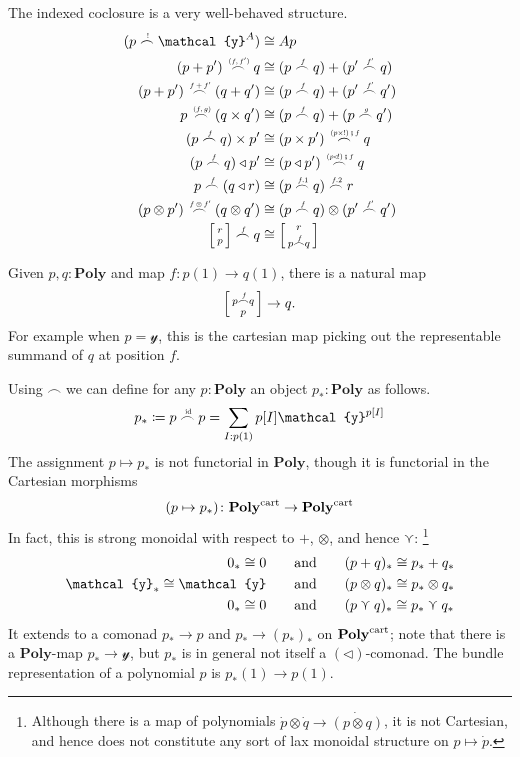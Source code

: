\documentclass[11pt, one side, article]{memoir}
\makeatletter
\theoremstyle{definition}
\theoremstyle{plain}
\newcommand{\Cat}[1]{\mathbf{#1}}%
\newcommand{\id}{\mathrm{id}}
\newcommand{\then}{\mathbin{\fatsemi}}
\newcommand{\tn}[1]{\textnormal{#1}}
\newcommand{\yon}{{\mathcal{y}}}
\newcommand{\poly}{\Cat{Poly}}
\newcommand{\polycart}{\poly^{\tn{cart}}}
\newcommand{\0}{\textsf{0}}
\newcommand{\1}{\tn{\textsf{1}}}
\newcommand{\tri}{\mathbin{\triangleleft}}
\newcommand{\biglens}[2]{
     \begin{bmatrix}{\vphantom{f_f^f}#2} \\ {\vphantom{f_f^f}#1} \end{bmatrix}
}
\newcommand{\littlelens}[2]{
     \begin{bsmallmatrix}{\vphantom{f}#2} \\ {\vphantom{f}#1} \end{bsmallmatrix}
}
\newcommand{\lens}[2]{
  \relax\if@display
     \biglens{#1}{#2}
  \else
     \littlelens{#1}{#2}
  \fi
}
\newcommand{\indexcoclscale}[1]{\scalebox{.7}{#1}}
\newcommand{\cocl}[1]{
	\scriptsize\overset{\,\indexcoclscale{$#1$}}{\frown}\normalsize
}
\newcommand{\hh}[2][]{#1 \tn{#2} #1}
\newcommand{\qqand}{\hh[\qquad]{and}}
\makeatother
\begin{document}
The indexed coclosure is a very well-behaved structure.
\begin{align}
	(p\cocl{!}\yon^A)&\cong Ap\\
	(p+p')\cocl{(f,f')}q&\cong(p\cocl{f}q)+(p'\cocl{f'}q)\\
	(p+p')\cocl{f+f'}(q+q')&\cong(p\cocl{f}q)+(p'\cocl{f'}q')\\
	p\cocl{(f,g)}(q\times q')&\cong(p\cocl{f}q)+(p\cocl{g}q')\\
	(p\cocl{f}q)\times p'&\cong(p\times p')\cocl{(p\times!)\then f}q\\
	(p\cocl{f}q)\tri p'&\cong(p\tri p')\cocl{(p\tri!)\then f}q\\
	p\cocl{f}(q\tri r)&\cong(p\cocl{f.1}q)\cocl{f.2}r\\
	(p\otimes p')\cocl{f\otimes f'}(q\otimes q')&\cong(p\cocl{f}q)\otimes(p'\cocl{f'}q')\\
	\lens{p}{r}\cocl{f}q&\cong\lens{p\cocl{f}q}{r}
\end{align}

Given $p,q:\poly$ and map $f\colon p(1)\to q(1)$, there is a natural map
\begin{equation}
	\lens{p}{p\cocl{f}q}\to q.
\end{equation}
For example when $p=\yon$, this is the cartesian map picking out the representable summand of $q$ at position $f$.

Using $\frown$ we can define for any $p:\poly$ an object $p_*:\poly$ as follows.
\begin{equation}\label{eqn.p_star}
p_*\coloneqq p\cocl{\id}p=\sum_{I: p(1)}p[I]\yon^{p[I]}
\end{equation}
The assignment $p\mapsto p_*$ is not functorial in $\poly$, though it is functorial in the Cartesian morphisms
\begin{equation}
	(p\mapsto p_*)\colon\polycart\to\polycart
\end{equation}
In fact, this is strong monoidal with respect to $+$, $\otimes$, and hence $\curlyvee$:%
\footnote{Although there is a map of polynomials $\dot{p}\otimes\dot{q}\to\dot{(p\otimes q)}$, it is not Cartesian, and hence does not constitute any sort of lax monoidal structure on $p\mapsto\dot{p}$.}
\begin{align}
	0_*\cong 0
	&\qqand
	(p+q)_*\cong p_*+q_*\\
	\yon_*\cong\yon
	&\qqand
	(p\otimes q)_*\cong p_*\otimes q_*\\
	0_*\cong0
	&\qqand
	(p\curlyvee q)_*\cong p_*\curlyvee q_*
\end{align}
It extends to a comonad $p_*\to p$ and $p_*\to (p_*)_*$ on $\polycart$; note that there is a $\poly$-map $p_*\to\yon$, but $p_*$ is in general not itself a $(\tri)$-comonad. The bundle representation of a polynomial $p$ is $p_*(1)\to p(1)$. 
\end{document}
